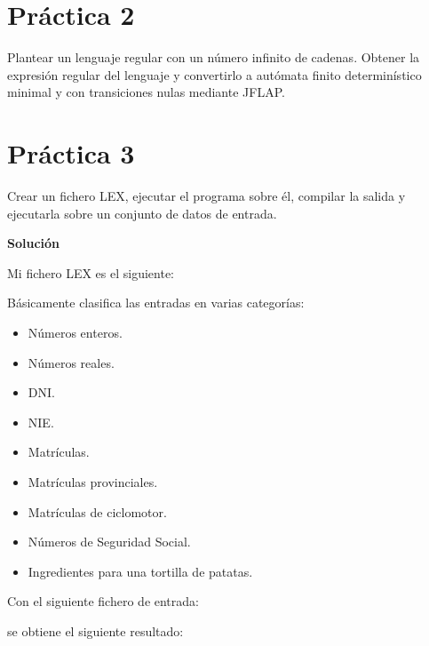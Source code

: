\documentclass[12pt,spanish]{article}
\newenvironment{solution}{
	\par
	\textbf{Solución}
	\par

}
{
}
\begin{document}
\section{Práctica 2}
Plantear un lenguaje regular con un número infinito de cadenas. Obtener la expresión regular del lenguaje y convertirlo a autómata finito determinístico minimal y con transiciones nulas mediante JFLAP.


\section{Práctica 3}
Crear un fichero LEX, ejecutar el programa sobre él, compilar la salida y ejecutarla sobre un conjunto de datos de entrada.

\begin{solution}
	Mi fichero LEX es el siguiente:
	
	Básicamente clasifica las entradas en varias categorías:
	\begin{itemize}
		\item Números enteros.
		\item Números reales.
		\item DNI.
		\item NIE.
		\item Matrículas.
		\item Matrículas provinciales.
		\item Matrículas de ciclomotor.
		\item Números de Seguridad Social.
		\item Ingredientes para una tortilla de patatas.
	\end{itemize}
	Con el siguiente fichero de entrada:
	
	se obtiene el siguiente resultado:
	
\end{solution}
\end{document}
